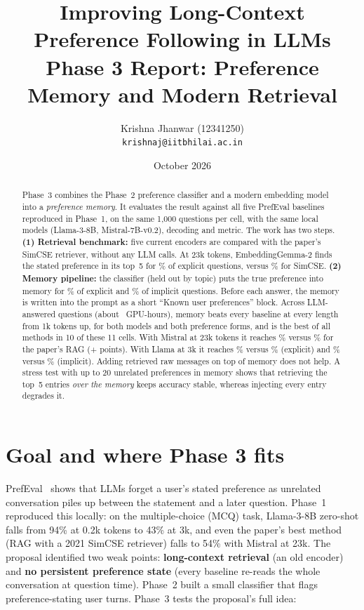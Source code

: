 \documentclass[11pt,a4paper]{article}
\title{\textbf{Improving Long-Context Preference Following in LLMs}\\[2pt]
\large Phase 3 Report: Preference Memory and Modern Retrieval}
\author{Krishna Jhanwar (12341250)\\ \small\texttt{krishnaj@iitbhilai.ac.in}}
\date{October 2026}
\begin{document}
\maketitle

\begin{abstract}
\noindent
Phase~3 combines the Phase~2 preference classifier and a modern embedding model into a \emph{preference memory}. It evaluates the result
against all five PrefEval baselines reproduced in Phase~1, on the same 1{,}000 questions per cell, with the same local models (Llama-3-8B,
Mistral-7B-v0.2), decoding and metric. The work has two steps.
\textbf{(1) Retrieval benchmark:} five current encoders are compared with the paper's SimCSE retriever, without any LLM calls. At 23k tokens,
EmbeddingGemma-2 finds the stated preference in its top~5 for \qGemExR\% of explicit questions, versus \qSimExR\% for SimCSE.
\textbf{(2) Memory pipeline:} the classifier (held out by topic) puts the true preference into memory for \qMemEx\% of explicit and
\qMemIm\% of implicit questions. Before each answer, the memory is written into the prompt as a short ``Known user preferences'' block.
Across \qTotalQ{} LLM-answered questions (about \qGpuHours{}~GPU-hours), memory beats every baseline at every length from 1k tokens up, for both models
and both preference forms, and is the best of all methods in 10 of these 11 cells. With Mistral at 23k tokens it reaches \qMiMemTwentyThree\% versus \qMiRagTwentyThree\% for the paper's RAG
(+\qMiGainTwentyThree{} points). With Llama at 3k it reaches \qLlExMemThree\% versus \qLlExRagThree\% (explicit) and \qLlImMemThree\% versus
\qLlImRagThree\% (implicit). Adding retrieved raw messages on top of memory does not help. A stress test with up to 20 unrelated preferences
in memory shows that retrieving the top~5 entries \emph{over the memory} keeps accuracy stable, whereas injecting every entry degrades it.
\end{abstract}

\section{Goal and where Phase 3 fits}
PrefEval~\cite{prefeval} shows that LLMs forget a user's stated preference as unrelated conversation piles up between the statement and a later
question. Phase~1 reproduced this locally: on the multiple-choice (MCQ) task, Llama-3-8B zero-shot falls from 94\% at 0.2k tokens to 43\% at 3k,
and even the paper's best method (RAG with a 2021 SimCSE retriever) falls to 54\% with Mistral at 23k. The proposal identified two weak points:
\textbf{long-context retrieval} (an old encoder) and \textbf{no persistent preference state} (every baseline re-reads the whole conversation at
question time). Phase~2 built a small classifier that flags preference-stating user turns. Phase~3 tests the proposal's full idea:
\end{document}
